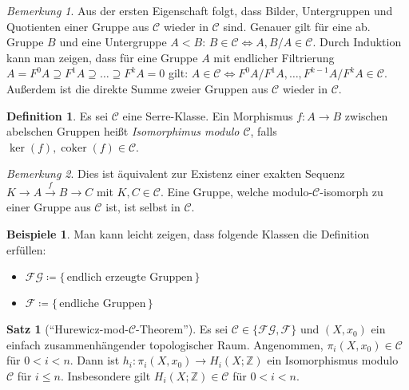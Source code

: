 \documentclass[11pt, a4paper, german]{article}
\theoremstyle{definition}
\newtheorem{satz}{Satz}
\newtheorem{defn}{Definition}
\newtheorem{bspe}{Beispiele}
\theoremstyle{remark}
\newtheorem*{bem}{Bemerkung}
\newcommand{\Z}{\mathbb{Z}} %
\DeclareMathOperator{\coker}{coker} %
\newcommand{\SC}{\mathcal{C}} %
\newcommand{\FG}{\mathcal{FG}} %
\newcommand{\F}{\mathcal{F}} %
\begin{document}
\begin{bem}
  Aus der ersten Eigenschaft folgt, dass Bilder, Untergruppen und Quotienten einer Gruppe aus $\SC$ wieder in $\SC$ sind.
  Genauer gilt für eine ab. Gruppe $B$ und eine Untergruppe $A < B$: $B \in \SC \iff A, B/A \in \SC$.
  Durch Induktion kann man zeigen, dass für eine Gruppe $A$ mit endlicher Filtrierung
  $A = F^0 A \supseteq F^1 A \supseteq \ldots \supseteq F^k A = 0$
  gilt: $A \in \SC \iff F^0 A / F^1 A, \ldots, F^{k-1} A / F^k A \in \SC$.
  Außerdem ist die direkte Summe zweier Gruppen aus $\SC$ wieder in $\SC$.
\end{bem}

\begin{defn}
  Es sei $\SC$ eine Serre-Klasse.
  Ein Morphismus $f : A \to B$ zwischen abelschen Gruppen heißt \emph{Isomorphimus modulo $\SC$}, falls $\ker(f), \coker(f) \in \SC$. \\
\end{defn}

\begin{bem}
  Dies ist äquivalent zur Existenz einer exakten Sequenz $K \to A \xrightarrow{f} B \to C$ mit $K, C \in \SC$.
  Eine Gruppe, welche modulo-$\SC$-isomorph zu einer Gruppe aus $\SC$ ist, ist selbst in $\SC$.
\end{bem}

\begin{bspe}
  Man kann leicht zeigen, dass folgende Klassen die Definition erfüllen:
  \begin{itemize}
    \item $\FG \coloneqq \{\, \text{endlich erzeugte Gruppen} \,\}$
    \item $\F \coloneqq \{\, \text{endliche Gruppen} \,\}$
  \end{itemize}
\end{bspe}


\begin{satz}["`Hurewicz-mod-$\SC$-Theorem"']\label{hurewicz-mod-c}
  Es sei $\SC \in \{ \FG, \F \}$ und
  $(X, x_0)$ ein einfach zusammenhängender topologischer Raum.
  Angenommen, $\pi_i(X, x_0) \in \SC$ für $0 < i < n$.
  Dann ist $h_i : \pi_i(X, x_0) \to H_i(X; \Z)$ ein Isomorphismus modulo $\SC$ für $i \leq n$.
  Insbesondere gilt $H_i(X; \Z) \in \SC$ für $0 < i < n$.
\end{satz}

\end{document}
